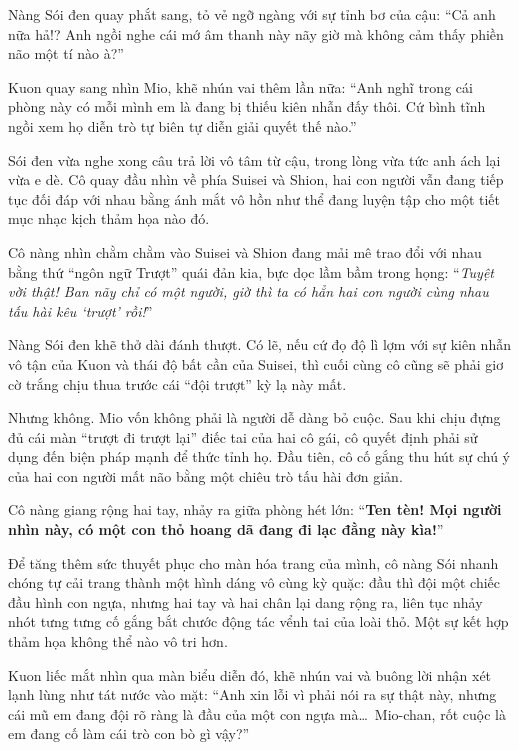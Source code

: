 \documentclass[../main.tex]{subfiles}
\begin{document}
Nàng Sói đen quay phắt sang, tỏ vẻ ngỡ ngàng với sự tỉnh bơ của cậu: ``Cả anh nữa hả!? Anh ngồi nghe cái mớ âm thanh này nãy giờ mà không cảm thấy phiền não một tí nào à?''

Kuon quay sang nhìn Mio, khẽ nhún vai thêm lần nữa: ``Anh nghĩ trong cái phòng này có mỗi mình em là đang bị thiếu kiên nhẫn đấy thôi. Cứ bình tĩnh ngồi xem họ diễn trò tự biên tự diễn giải quyết thế nào.''

Sói đen vừa nghe xong câu trả lời vô tâm từ cậu, trong lòng vừa tức anh ách lại vừa e dè. Cô quay đầu nhìn về phía Suisei và Shion, hai con người vẫn đang tiếp tục đối đáp với nhau bằng ánh mắt vô hồn như thể đang luyện tập cho một tiết mục nhạc kịch thảm họa nào đó.

Cô nàng nhìn chằm chằm vào Suisei và Shion đang mải mê trao đổi với nhau bằng thứ ``ngôn ngữ Trượt'' quái đản kia, bực dọc lầm bầm trong họng: ``\textit{Tuyệt vời thật! Ban nãy chỉ có một người, giờ thì ta có hẳn hai con người cùng nhau tấu hài kêu `trượt' rồi!}''

Nàng Sói đen khẽ thở dài đánh thượt. Có lẽ, nếu cứ đọ độ lì lợm với sự kiên nhẫn vô tận của Kuon và thái độ bất cần của Suisei, thì cuối cùng cô cũng sẽ phải giơ cờ trắng chịu thua trước cái ``đội trượt'' kỳ lạ này mất.

Nhưng không. Mio vốn không phải là người dễ dàng bỏ cuộc. Sau khi chịu đựng đủ cái màn ``trượt đi trượt lại'' điếc tai của hai cô gái, cô quyết định phải sử dụng đến biện pháp mạnh để thức tỉnh họ. Đầu tiên, cô cố gắng thu hút sự chú ý của hai con người mất não bằng một chiêu trò tấu hài đơn giản.

Cô nàng giang rộng hai tay, nhảy ra giữa phòng hét lớn: ``\textbf{Ten tèn! Mọi người nhìn này, có một con thỏ hoang dã đang đi lạc đằng này kìa!}''

Để tăng thêm sức thuyết phục cho màn hóa trang của mình, cô nàng Sói nhanh chóng tự cải trang thành một hình dáng vô cùng kỳ quặc: đầu thì đội một chiếc đầu hình con ngựa, nhưng hai tay và hai chân lại dang rộng ra, liên tục nhảy nhót tưng tưng cố gắng bắt chước động tác vểnh tai của loài thỏ. Một sự kết hợp thảm họa không thể nào vô tri hơn.


Kuon liếc mắt nhìn qua màn biểu diễn  đó, khẽ nhún vai và buông lời nhận xét lạnh lùng như tát nước vào mặt: ``Anh xin lỗi vì phải nói ra sự thật này, nhưng cái mũ em đang đội rõ ràng là đầu của một con ngựa mà\dots\ Mio-chan, rốt cuộc là em đang cố làm cái trò con bò gì vậy?''
\end{document}
